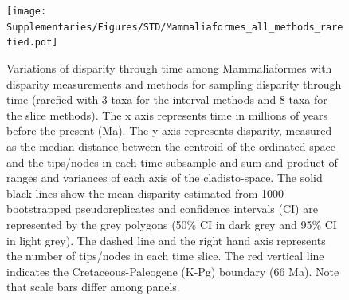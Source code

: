 \begin{landscape}
\begin{figure}[!htbp]
\centering
    \texttt{[image: Supplementaries/Figures/STD/Mammaliaformes\_all\_methods\_rarefied.pdf]}
\caption[Comparison of all the disparity metrics and all the time series methods for Mammaliaformes (rarefied)]{Variations of disparity through time among Mammaliaformes with disparity measurements and methods for sampling disparity through time (rarefied with 3 taxa for the interval methods and 8 taxa for the slice methods). The x axis represents time in millions of years before the present (Ma). The y axis represents disparity, measured as the median distance between the centroid of the ordinated space and the tips/nodes in each time subsample and sum and product of ranges and variances of each axis of the cladisto-space. The solid black lines show the mean disparity estimated from 1000 bootstrapped pseudoreplicates and confidence intervals (CI) are represented by the grey polygons (50\% CI in dark grey and 95\% CI in light grey). The dashed line and the right hand axis represents the number of tips/nodes in each time slice. The red vertical line indicates the Cretaceous-Paleogene (K-Pg) boundary (66 Ma). Note that scale bars differ among panels.}
\label{Supp_disparity_all_Mammaliaformes_rarefied}
\end{figure}
\end{landscape}

